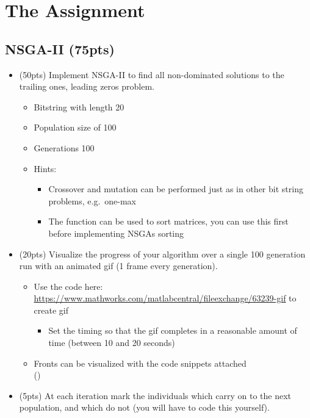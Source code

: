 \documentclass{article}
\begin{document}
\newpage
\section{The Assignment}

\subsection{NSGA-II (75pts)}
\begin{itemize}
	\item (50pts) Implement NSGA-II to find all non-dominated solutions to the trailing ones, leading zeros problem. 
	\begin{itemize}
		\item Bitstring with length 20
		\item Population size of 100
		\item Generations 100
		\item Hints:
		\begin{itemize}
			\item Crossover and mutation can be performed just as in other bit string problems, e.g.\ one-max
			\item The  function can be used to sort matrices, you can use this first before implementing NSGAs sorting
		\end{itemize}
	\end{itemize}
	\item (20pts) Visualize the progress of your algorithm over a single 100 generation run with an animated gif (1 frame every generation).
	\begin{itemize}
		\item Use the code here: \url{https://www.mathworks.com/matlabcentral/fileexchange/63239-gif} to create gif
		\begin{itemize}
			\item Set the timing so that the gif completes in a reasonable amount of time (between 10 and 20 seconds)
		\end{itemize}
		\item Fronts can be visualized with the code snippets attached\\ ()
	\end{itemize}
	\item (5pts) At each iteration mark the individuals which carry on to the next population, and which do not (you will have to code this yourself).
\end{itemize}

\newpage
\end{document}
